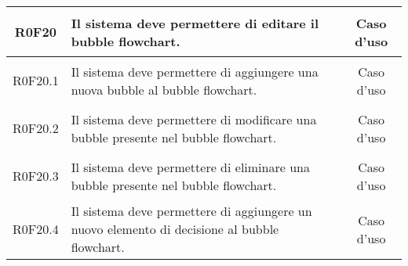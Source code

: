 \documentclass[../AnalisiDeiRequisiti.tex]{subfiles}
\begin{document}
\begin{longtable}{|c|>{\centering}p{7cm}|c|}
\hypertarget{R0F20}{R0F20} & Il sistema deve permettere di editare il bubble flowchart. & Caso d'uso \\ \hline
\hypertarget{R0F20.1}{R0F20.1} & Il sistema deve permettere di aggiungere una nuova bubble al bubble flowchart. & Caso d'uso \\ \hline
\hypertarget{R0F20.2}{R0F20.2} & Il sistema deve permettere di modificare una bubble presente nel bubble flowchart. & Caso d'uso \\ \hline
\hypertarget{R0F20.3}{R0F20.3} & Il sistema deve permettere di eliminare una bubble presente nel bubble flowchart. & Caso d'uso \\ \hline
\hypertarget{R0F20.4}{R0F20.4} & Il sistema deve permettere di aggiungere un nuovo elemento di decisione al bubble flowchart. & Caso d'uso \\ \hline

\end{longtable}
\end{document}
